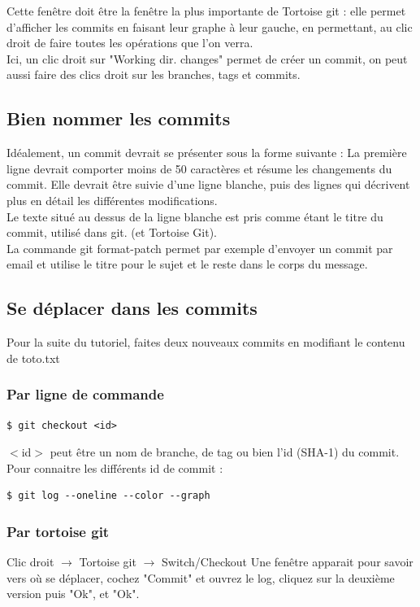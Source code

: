 Cette fenêtre doit être la fenêtre la plus importante de Tortoise git : elle permet d'afficher les commits en faisant leur graphe à leur gauche, en permettant, au clic droit de faire toutes les opérations que l'on verra.\\
Ici, un clic droit sur "Working dir. changes" permet de créer un commit,
on peut aussi faire des clics droit sur les branches, tags et commits.
\newpage
\subsection{Bien nommer les commits}

Idéalement, un commit devrait se présenter sous la forme suivante :
La première ligne devrait comporter moins de 50 caractères et résume les changements du commit.
Elle devrait être suivie d'une ligne blanche, puis des lignes qui décrivent plus en détail les différentes modifications.\\

Le texte situé au dessus de la ligne blanche est pris comme étant le titre du commit, utilisé dans git. (et Tortoise Git).\\
La commande git format-patch permet par exemple d'envoyer un commit par email et utilise le titre pour le sujet et le reste dans le corps du message.

\subsection{Se déplacer dans les commits}

Pour la suite du tutoriel,
faites deux nouveaux commits en modifiant le contenu de toto.txt

\subsubsection{Par ligne de commande}
\begin{verbatim}
$ git checkout <id>
\end{verbatim}

$<$id$>$ peut être un nom de branche, de tag ou bien l'id (SHA-1) du commit.
Pour connaitre les différents id de commit : 

\begin{verbatim}
$ git log --oneline --color --graph
\end{verbatim}

\subsubsection{Par tortoise git}
Clic droit $\rightarrow$ Tortoise git $\rightarrow$ Switch/Checkout
Une fenêtre apparait pour savoir vers où se déplacer, cochez "Commit" et ouvrez le log, cliquez sur la deuxième version puis "Ok", et "Ok".\\

